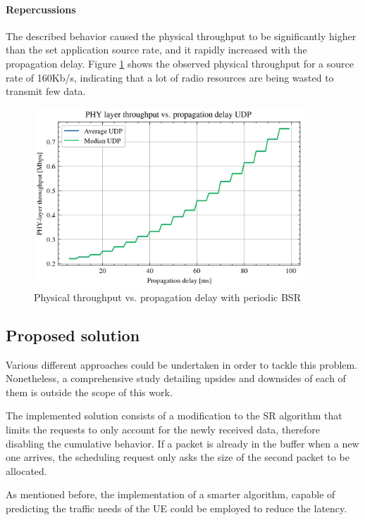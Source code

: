 \paragraph{Repercussions}
The described behavior caused the physical throughput to be significantly higher than the set application source rate, and it rapidly increased with the propagation delay. Figure \ref{fig:phy-thr-runaway} shows the observed physical throughput for a source rate of 160Kb/s, indicating that a lot of radio resources are being wasted to transmit few data.

\begin{figure}[ht]
    \centering
    \includegraphics[width=0.9\textwidth]{res/phy-thr-udp-runaway.png}
    \caption{Physical throughput vs. propagation delay with periodic \ac{BSR}}
    \label{fig:phy-thr-runaway}
\end{figure}

\subsection{Proposed solution}

Various different approaches could be undertaken in order to tackle this problem. Nonetheless, a comprehensive study detailing upsides and downsides of each of them is outside the scope of this work. 

The implemented solution consists of a modification to the \ac{SR} algorithm that limits the requests to only account for the newly received data, therefore disabling the cumulative behavior. If a packet is already in the buffer when a new one arrives, the scheduling request only asks the size of the second packet to be allocated.

As mentioned before, the implementation of a smarter algorithm, capable of predicting the traffic needs of the \ac{UE} could be employed to reduce the latency. 

